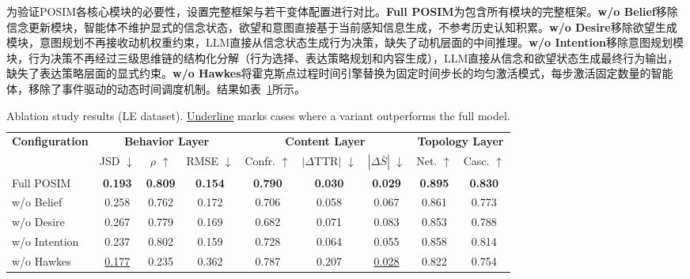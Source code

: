 \documentclass[a4paper,fleqn]{cas-sc}
\newcommand{\best}[1]{\textbf{#1}}
\begin{document}
为验证POSIM各核心模块的必要性，设置完整框架与若干变体配置进行对比。\textbf{Full POSIM}为包含所有模块的完整框架。\textbf{w/o Belief}移除信念更新模块，智能体不维护显式的信念状态，欲望和意图直接基于当前感知信息生成，不参考历史认知积累。\textbf{w/o Desire}移除欲望生成模块，意图规划不再接收动机权重约束，LLM直接从信念状态生成行为决策，缺失了动机层面的中间推理。\textbf{w/o Intention}移除意图规划模块，行为决策不再经过三级思维链的结构化分解（行为选择、表达策略规划和内容生成），LLM直接从信念和欲望状态生成最终行为输出，缺失了表达策略层面的显式约束。\textbf{w/o Hawkes}将霍克斯点过程时间引擎替换为固定时间步长的均匀激活模式，每步激活固定数量的智能体，移除了事件驱动的动态时间调度机制。结果如表~\ref{tab:ablation}所示。

\begin{table}[!t]
\centering
\caption{Ablation study results (LE dataset). \underline{Underline} marks cases where a variant outperforms the full model.}
\label{tab:ablation}
\small
\renewcommand{\arraystretch}{1.05}
\begin{tabular}{@{}l ccc ccc cc@{}}
\toprule
\multirow{2}{*}{\textbf{Configuration}} & \multicolumn{3}{c}{\textbf{Behavior Layer}} & \multicolumn{3}{c}{\textbf{Content Layer}} & \multicolumn{2}{c}{\textbf{Topology Layer}} \\
\cmidrule(lr){2-4} \cmidrule(lr){5-7} \cmidrule(lr){8-9}
& \makecell{JSD\\$\downarrow$} & \makecell{$\rho$\\$\uparrow$} & \makecell{RMSE\\$\downarrow$}
& \makecell{Confr.\\$\uparrow$} & \makecell{$|\Delta$TTR$|$\\$\downarrow$} & \makecell{$|\Delta\bar{S}|$\\$\downarrow$}
& \makecell{Net.\\$\uparrow$} & \makecell{Casc.\\$\uparrow$} \\
\midrule
\rowcolor{grayrow}
Full POSIM & \best{0.193} & \best{0.809} & \best{0.154} & \best{0.790} & \best{0.030} & \best{0.029} & \best{0.895} & \best{0.830} \\
w/o Belief & 0.258 & 0.762 & 0.172 & 0.706 & 0.058 & 0.067 & 0.861 & 0.773 \\
w/o Desire & 0.267 & 0.779 & 0.169 & 0.682 & 0.071 & 0.083 & 0.853 & 0.788 \\
w/o Intention & 0.237 & 0.802 & 0.159 & 0.728 & 0.064 & 0.055 & 0.858 & 0.814 \\
w/o Hawkes & \underline{0.177} & 0.235 & 0.362 & 0.787 & 0.207 & \underline{0.028} & 0.822 & 0.754 \\
\bottomrule
\end{tabular}
\end{table}
\end{document}
